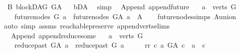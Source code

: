 \begin{isabellebody}
\isamarkupfalse%
\ B{}{\isacharcolon}{\kern0pt}\ blockDAG\ G{\isacharunderscore}{\kern0pt}A%
\isadelimproof
\ %
\endisadelimproof
%
\isatagproof
{}\isamarkupfalse%
\ bD{\isacharunderscore}{\kern0pt}A\ \isamarkupfalse%
\ simp%
\endisatagproof
{\isafoldproof}%
%
\isadelimproof
%
\endisadelimproof
\isanewline
\isanewline
{}\isamarkupfalse%
\ {\isacharparenleft}{\kern0pt}\ Append{\isacharparenright}{\kern0pt}\ append{\isacharunderscore}{\kern0pt}future{\isacharcolon}{\kern0pt}\isanewline
\ \ \ {\isachardoublequoteopen}a\ {\isasymin}\ verts\ G{\isachardoublequoteclose}\isanewline
\ \ \ {\isachardoublequoteopen}future{\isacharunderscore}{\kern0pt}nodes\ G\ a\ {\isacharequal}{\kern0pt}\ future{\isacharunderscore}{\kern0pt}nodes\ G{\isacharunderscore}{\kern0pt}A\ a\ {\isacharminus}{\kern0pt}\ A{\isachardoublequoteclose}\isanewline
%
\isadelimproof
\ \ %
\endisadelimproof
%
\isatagproof
{}\isamarkupfalse%
\ future{\isacharunderscore}{\kern0pt}nodes{\isachardot}{\kern0pt}simps\ A{\isacharunderscore}{\kern0pt}union\isanewline
{}\isamarkupfalse%
{\isacharparenleft}{\kern0pt}auto\ simp{\isacharcolon}{\kern0pt}\ assms\ reachable{}{\isacharunderscore}{\kern0pt}preserve\ append{\isacharunderscore}{\kern0pt}verts{\isacharunderscore}{\kern0pt}elims{\isacharparenright}{\kern0pt}\ \isamarkupfalse%
%
\endisatagproof
{\isafoldproof}%
%
\isadelimproof
\isanewline
%
\endisadelimproof
\isanewline
{}\isamarkupfalse%
\ {\isacharparenleft}{\kern0pt}\ Append{\isacharparenright}{\kern0pt}\ append{\isacharunderscore}{\kern0pt}reduce{\isacharunderscore}{\kern0pt}some{\isacharcolon}{\kern0pt}\isanewline
\ \ \ {\isachardoublequoteopen}a\ {\isasymin}\ verts\ G{\isachardoublequoteclose}\isanewline
\ \ \ {\isachardoublequoteopen}reduce{\isacharunderscore}{\kern0pt}past\ G{\isacharunderscore}{\kern0pt}A\ a\ {\isacharequal}{\kern0pt}\ reduce{\isacharunderscore}{\kern0pt}past\ G\ a{\isachardoublequoteclose}\isanewline
%
\isadelimproof
%
\endisadelimproof
%
\isatagproof
{}\isamarkupfalse%
\ {\isacharminus}{\kern0pt}\isanewline
\ \ \isamarkupfalse%
\ rr{\isacharcolon}{\kern0pt}\ {\isachardoublequoteopen}{\isasymAnd}c{\isachardot}{\kern0pt}\ {\isacharparenleft}{\kern0pt}a\ {\isasymrightarrow}\isactrlsup {\isacharplus}{\kern0pt}\isactrlbsub G{\isacharunderscore}{\kern0pt}A\isactrlesub \ c{\isacharparenright}{\kern0pt}\ {\isacharequal}{\kern0pt}\ {\isacharparenleft}{\kern0pt}a\ {\isasymrightarrow}\isactrlsup {\isacharplus}{\kern0pt}\ c{\isacharparenright}{\kern0pt}{\isachardoublequoteclose}\ \isamarkupfalse%

\end{isabellebody}
